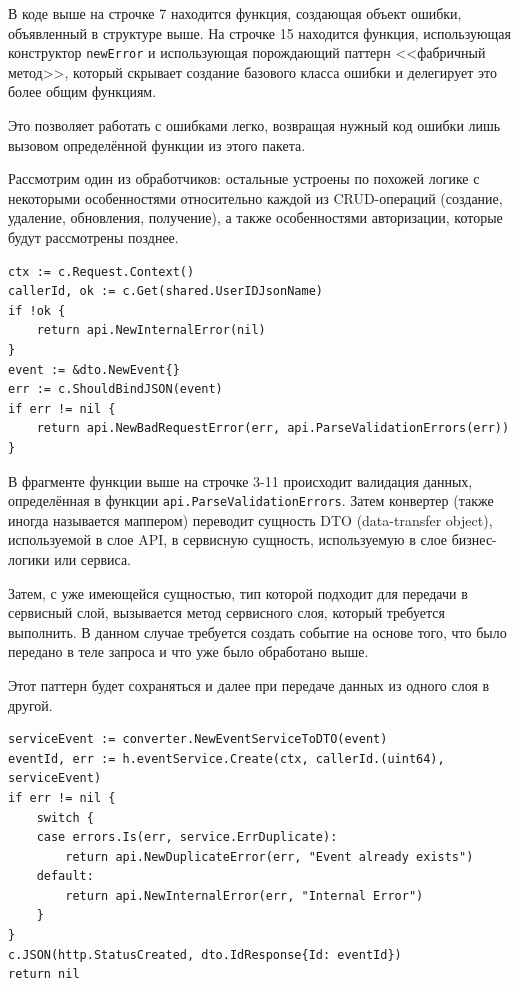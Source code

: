 \documentclass[diploma]{SCWorks}
\begin{document}
В коде выше на строчке 7 находится функция, создающая объект ошибки, объявленный
в структуре выше. На строчке 15 находится функция, использующая конструктор 
\texttt{newError} и использующая порождающий паттерн <<фабричный метод>>,
который скрывает создание базового класса ошибки и делегирует это более общим
функциям.

Это позволяет работать с ошибками легко, возвращая нужный код ошибки лишь 
вызовом определённой функции из этого пакета.

Рассмотрим один из обработчиков: остальные устроены по похожей логике с некоторыми
особенностями относительно каждой из CRUD-операций (создание, удаление, 
обновления, получение), а также особенностями авторизации, которые будут 
рассмотрены позднее.

\begin{verbatim}
ctx := c.Request.Context()
callerId, ok := c.Get(shared.UserIDJsonName)
if !ok {
    return api.NewInternalError(nil)
}
event := &dto.NewEvent{}
err := c.ShouldBindJSON(event)
if err != nil {
    return api.NewBadRequestError(err, api.ParseValidationErrors(err))
}
\end{verbatim}

В фрагменте функции выше на строчке 3-11 происходит валидация данных, определённая в 
функции \texttt{api.ParseValidationErrors}. Затем конвертер (также иногда
называется маппером) переводит сущность DTO (data-transfer object), используемой
в слое API, в сервисную сущность, используемую в слое бизнес-логики или сервиса.

Затем, с уже имеющейся сущностью, тип которой подходит для передачи в сервисный
слой, вызывается метод сервисного слоя, который требуется выполнить. В данном
случае требуется создать событие на основе того, что было передано в 
теле запроса и что уже было обработано выше.

Этот паттерн будет сохраняться и далее при передаче данных из одного слоя 
в другой.

\begin{verbatim}
serviceEvent := converter.NewEventServiceToDTO(event)
eventId, err := h.eventService.Create(ctx, callerId.(uint64), serviceEvent)
if err != nil {
    switch {
    case errors.Is(err, service.ErrDuplicate):
        return api.NewDuplicateError(err, "Event already exists")
    default:
        return api.NewInternalError(err, "Internal Error")
    }
}
c.JSON(http.StatusCreated, dto.IdResponse{Id: eventId})
return nil
\end{verbatim}
\end{document}
